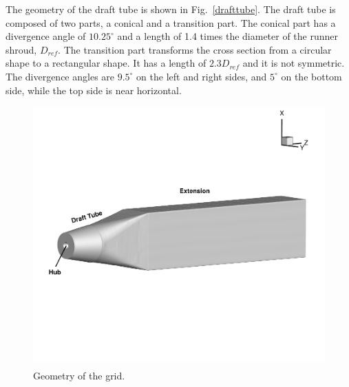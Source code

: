The geometry of the draft tube is shown in Fig.~\ref{drafttube}. The draft tube is composed of two parts, a conical and a transition part. The conical part has a divergence angle of $10.25^{\circ}$ and a length of 1.4 times the diameter of the runner shroud, $D_{ref}$. The transition part transforms the cross section from a circular shape to a rectangular shape. It has a length of  $2.3D_{ref}$ and it is not symmetric. The divergence angles are $9.5^{\circ}$ on the left and right sides, and $5^{\circ}$ on the bottom side, while the top side is near horizontal.
\begin{figure}[t]  
\centering
     \includegraphics[clip=true, trim= 1.75cm 9.5cm 1.75cm 0.0cm,width=0.99\linewidth]{./figures/bulbt/geometry}                            
     \caption{Geometry of the grid.}
     \label{geometry}
\end{figure}

